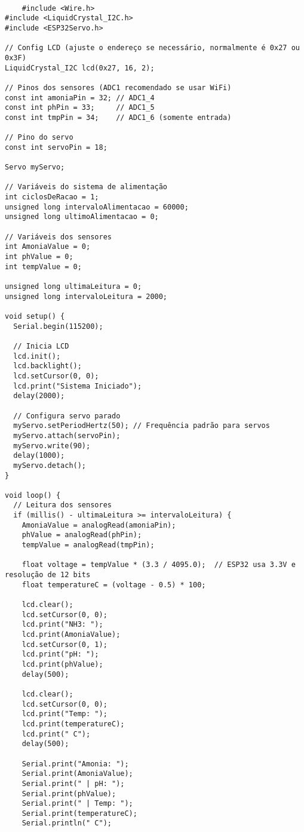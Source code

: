 \begin{verbatim}

    #include <Wire.h>
#include <LiquidCrystal_I2C.h>
#include <ESP32Servo.h>

// Config LCD (ajuste o endereço se necessário, normalmente é 0x27 ou 0x3F)
LiquidCrystal_I2C lcd(0x27, 16, 2);

// Pinos dos sensores (ADC1 recomendado se usar WiFi)
const int amoniaPin = 32; // ADC1_4
const int phPin = 33;     // ADC1_5
const int tmpPin = 34;    // ADC1_6 (somente entrada)

// Pino do servo
const int servoPin = 18;

Servo myServo;

// Variáveis do sistema de alimentação
int ciclosDeRacao = 1;
unsigned long intervaloAlimentacao = 60000;
unsigned long ultimoAlimentacao = 0;

// Variáveis dos sensores
int AmoniaValue = 0;
int phValue = 0;
int tempValue = 0;

unsigned long ultimaLeitura = 0;
unsigned long intervaloLeitura = 2000;

void setup() {
  Serial.begin(115200);

  // Inicia LCD
  lcd.init();
  lcd.backlight();
  lcd.setCursor(0, 0);
  lcd.print("Sistema Iniciado");
  delay(2000);

  // Configura servo parado
  myServo.setPeriodHertz(50); // Frequência padrão para servos
  myServo.attach(servoPin);
  myServo.write(90);
  delay(1000);
  myServo.detach();
}

void loop() {
  // Leitura dos sensores
  if (millis() - ultimaLeitura >= intervaloLeitura) {
    AmoniaValue = analogRead(amoniaPin);
    phValue = analogRead(phPin);
    tempValue = analogRead(tmpPin);

    float voltage = tempValue * (3.3 / 4095.0);  // ESP32 usa 3.3V e resolução de 12 bits
    float temperatureC = (voltage - 0.5) * 100;

    lcd.clear();
    lcd.setCursor(0, 0);
    lcd.print("NH3: ");
    lcd.print(AmoniaValue);
    lcd.setCursor(0, 1);
    lcd.print("pH: ");
    lcd.print(phValue);
    delay(500);

    lcd.clear();
    lcd.setCursor(0, 0);
    lcd.print("Temp: ");
    lcd.print(temperatureC);
    lcd.print(" C");
    delay(500);

    Serial.print("Amonia: ");
    Serial.print(AmoniaValue);
    Serial.print(" | pH: ");
    Serial.print(phValue);
    Serial.print(" | Temp: ");
    Serial.print(temperatureC);
    Serial.println(" C");


\end{verbatim}
